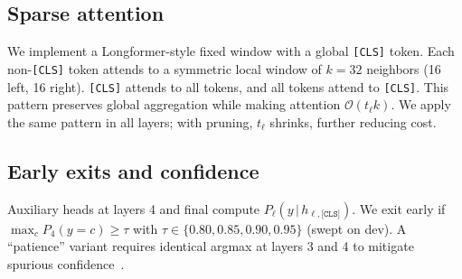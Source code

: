 \documentclass[11pt,letterpaper]{article}
\theoremstyle{plain}
\newcommand{\cls}{\texttt{[CLS]}}
\begin{document}
\subsection{Sparse attention}
We implement a Longformer-style fixed window with a global \cls{} token. Each non-\cls{} token attends to a symmetric local window of $k{=}32$ neighbors (16 left, 16 right). \cls{} attends to all tokens, and all tokens attend to \cls{}. This pattern preserves global aggregation while making attention $\mathcal{O}(t_\ell k)$. We apply the same pattern in all layers; with pruning, $t_\ell$ shrinks, further reducing cost.

\subsection{Early exits and confidence}
Auxiliary heads at layers 4 and final compute $P_\ell(y\,|\,h_{\ell,\cls{}})$. We exit early if $\max_c P_4(y{=}c) \ge \tau$ with $\tau \in \{0.80,0.85,0.90,0.95\}$ (swept on dev). A ``patience'' variant requires identical argmax at layers 3 and 4 to mitigate spurious confidence~\citep{zhou2020bert}.
\end{document}
